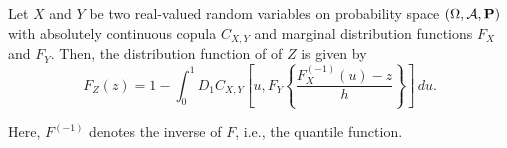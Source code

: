 
\begin{proposition}
  \label{prop:dfrh}
  Let $X$ and $Y$ be two real-valued  random
  variables on 
  probability space $(\Omega, \mathcal A, {\bf P})$ with 
  absolutely continuous copula $C_{X, Y}$ and
   marginal distribution functions $F_{X}$
  and $F_{Y}$. Then, the distribution function of of $Z$ is given by 
  \begin{equation}
    \label{eq:3}
    F_{Z}(z) = 1- \int^1_0 D_1 C_{X, Y}
    \left[ u, F_{Y} \left\{ \frac{F^{(-1)}_{X}(u)-z}{h} \right\}
    \right]\, d u.
  \end{equation}
\end{proposition}
Here, $F^{(-1)}$ denotes the inverse of $F$, i.e., the quantile
function. 

